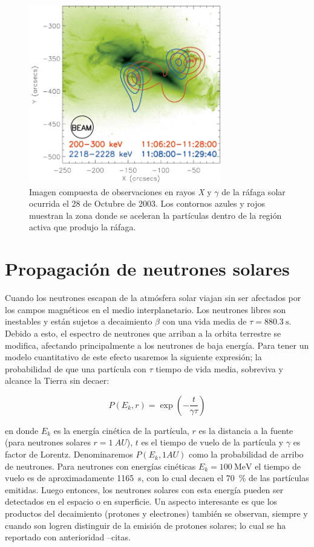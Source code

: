 \begin{figure}
        \centering
        \includegraphics[width=0.75\textwidth]{flare-footprints}
        \caption{Imagen compuesta de observaciones en rayos \emph{X} y $\gamma$ de la ráfaga solar ocurrida el \num{28} de Octubre de \num{2003}. Los contornos azules y rojos muestran la zona donde se aceleran la partículas dentro de la región activa que produjo la ráfaga.}
        \label{fig:flare-foot}
\end{figure}


\section{Propagación de neutrones solares}

Cuando los neutrones escapan de la atmósfera solar viajan sin ser afectados por los campos magnéticos en el medio interplanetario. Los neutrones libres son inestables y están sujetos a decaimiento $\beta$ con una vida media de $\tau=\SI{880.3}{\second}$. Debido a esto, el espectro de neutrones que arriban a la orbita terrestre se modifica, afectando principalmente a los neutrones de baja energía. Para tener un modelo cuantitativo de este efecto usaremos la siguiente expresión; la probabilidad de que una partícula con $\tau$ tiempo de vida media, sobreviva y alcance la Tierra sin decaer:

\begin{equation}
P\left(E_{k},r\right)=\exp\left(-\frac{t}{\gamma\tau}\right)
\end{equation}

en donde $E_{k}$ es la energía cinética de la partícula, $r$ es la distancia a la fuente (para neutrones solares $r=\SI{1}{AU}$), $t$ es el tiempo de vuelo de la partícula y $\gamma$ es factor de Lorentz. Denominaremos $P(E_{k},1AU)$ como la probabilidad de arribo de neutrones. Para neutrones con energías cinéticas $E_{k}=\SI{100}{\mega\electronvolt}$ el tiempo de vuelo es de aproximadamente \SI{1165}{\second}, con lo cual decaen el \SI{70}{\percent} de las partículas emitidas. Luego entonces, los neutrones solares con esta energía pueden ser detectados en el espacio o en superficie. Un aspecto interesante es que los productos del decaimiento (protones y electrones) también se observan, siempre y cuando son logren distinguir de la emisión de protones solares; lo cual se ha reportado con anterioridad --citas.

